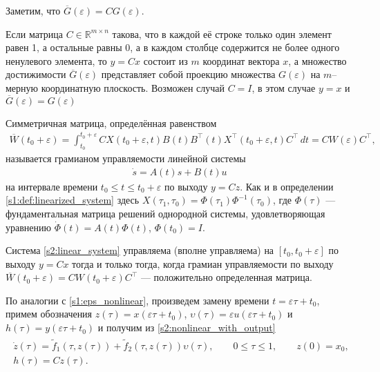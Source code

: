 \documentclass[../main.tex]{subfiles}
\begin{document}
Заметим, что $ \overline{G}(\varepsilon) = C G(\varepsilon) $. 
 
Если матрица $ C \in \mathbb{R}^{m \times n} $ такова, что в каждой её строке только один элемент равен 1, а остальные равны 0, а в каждом столбце содержится не более одного ненулевого элемента, то $ y=Cx $ состоит из $ m$ координат вектора $ x $, а множество достижимости $\overline{G}(\varepsilon)$ представляет собой проекцию множества $ G(\varepsilon) $ на $m$--мерную координатную плоскость. 
Возможен случай $C = I$, в этом случае $y = x$ и $ \overline{G}(\varepsilon) = G(\varepsilon)$


\begin{definition}
 Симметричная матрица, определённая равенством
 \begin{gather*}
 \overline{W}(t_0 + \varepsilon) = \int_{t_0}^{t_0+\varepsilon} C X(t_0+\varepsilon,t)B(t)B^{\top}(t)X^{\top}(t_0+\varepsilon,t) C^\top \, dt=CW(\varepsilon)C^\top,
 \end{gather*}
 называется грамианом управляемости линейной системы 
 \begin{gather}\label{s2:linear_system}
 	\dot{s} = A(t) s + B(t) u
 \end{gather}
 на интервале времени $ t_0 \leqslant t \leqslant t_0 + \varepsilon $ по выходу $y = C z$. 
 Как и в определении \ref{s1:def:linearized_system} здесь $X(\tau_1, \tau_0) = \Phi(\tau_1) \Phi^{−1}(\tau_0)$, где $\Phi(\tau)$ ---
 фундаментальная матрица решений однородной системы, удовлетворяющая уравнению
 $\dot{\Phi}(t) = A(t) \Phi(t)$, $\Phi(t_0) = I$.
\end{definition}
 
Система \eqref{s2:linear_system} управляема (вполне управляема) на $ [t_0, t_0 + \varepsilon] $ по выходу $y=Cx$ тогда и только тогда,
когда грамиан управляемости по выходу $ \overline{W}(t_0 + \varepsilon) = C W(t_0 + \varepsilon) C^{\top} $ --- положительно определенная матрица.
 
 
По аналогии с \eqref{s1:eps_nonlinear}, произведем замену времени $t = \varepsilon \tau + t_0$, примем обозначения $z(\tau) = x(\varepsilon \tau + t_0)$, $ \upsilon(\tau) = \varepsilon u(\varepsilon \tau + t_0) $ и $h(\tau) = y(\varepsilon \tau + t_0)$ и получим из \eqref{s2:nonlinear_with_output}
\begin{gather}\label{s2:eps_nonlinear_with_output}
\begin{gathered}
	\dot{z}(\tau)=\widetilde{f}_1(\tau,z(\tau))+\widetilde{f}_2(\tau,z(\tau))\upsilon(\tau), \qquad 0 \leqslant \tau \leqslant 1, \qquad z(0) = x_0, \\
	h(\tau) = C z(\tau).
\end{gathered}
\end{gather}
\end{document}
